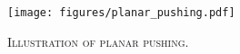 
\begin{figure}
    \centering
    \texttt{[image: figures/planar\_pushing.pdf]}
    \caption{\textsc{Illustration of planar pushing}. \label{fig:planar-pushing}}
    \vspace{-6mm}
\end{figure}
